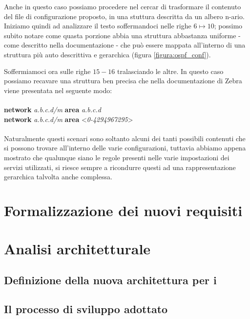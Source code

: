 Anche in questo caso possiamo procedere nel cercar di trasformare il contenuto del file di configurazione proposto, in una stuttura descritta da un albero n-ario. Iniziamo quindi ad analizzare il testo soffermandoci nelle righe $6\mapsto10$; possimo subito notare come quasta porzione abbia una struttura abbastanza uniforme - come descritto nella documentazione\cite{ZEBRADOC} - che può essere mappata all'interno di una struttura più auto descrittiva e gerarchica (figura \ref{figura:ospf_conf}).

Soffermiamoci ora sulle righe $15-16$ tralasciando le altre. In questo caso possiamo recavare una struttura ben precisa che nella documentazione di Zebra viene presentata nel seguente modo:
\\
\\
\textbf{network} \textit{a.b.c.d/m} \textbf{area} \textit{a.b.c.d}
\\
\textbf{network} \textit{a.b.c.d/m} \textbf{area} <\textit{0-4294967295}>
\\
\\
Naturalmente questi scenari sono soltanto alcuni dei tanti possibili contenuti che si possono trovare all'interno delle varie configurazioni, tuttavia abbiamo appena mostrato che qualunque siano le regole presenti nelle varie impostazioni dei servizi utilizzati, si riesce sempre a ricondurre questi ad una rappresentazione gerarchica talvolta anche complessa.

\section{Formalizzazione dei nuovi requisiti}

\section{Analisi architetturale}

\subsection{Definizione della nuova architettura per i \plugin{}}

\subsection{Il processo di sviluppo adottato}

